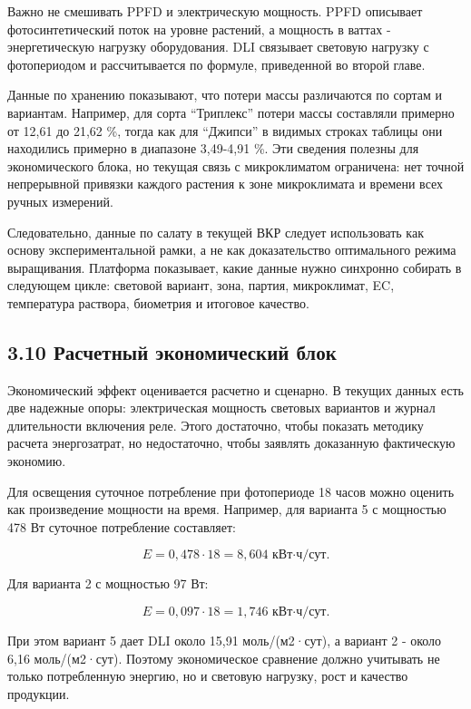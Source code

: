 \documentclass[a4paper,14pt]{extarticle}
\begin{document}
Важно не смешивать PPFD и электрическую мощность. PPFD описывает
фотосинтетический поток на уровне растений, а мощность в ваттах -
энергетическую нагрузку оборудования. DLI связывает световую нагрузку с
фотопериодом и рассчитывается по формуле, приведенной во второй главе.

Данные по хранению показывают, что потери массы различаются по сортам и
вариантам. Например, для сорта ``Триплекс'' потери массы составляли
примерно от 12,61 до 21,62 \%, тогда как для ``Джипси'' в видимых
строках таблицы они находились примерно в диапазоне 3,49-4,91 \%. Эти
сведения полезны для экономического блока, но текущая связь с
микроклиматом ограничена: нет точной непрерывной привязки каждого
растения к зоне микроклимата и времени всех ручных измерений.

Следовательно, данные по салату в текущей ВКР следует использовать как
основу экспериментальной рамки, а не как доказательство оптимального
режима выращивания. Платформа показывает, какие данные нужно синхронно
собирать в следующем цикле: световой вариант, зона, партия, микроклимат,
EC, температура раствора, биометрия и итоговое качество.

\subsection{3.10 Расчетный экономический
блок}\label{ux440ux430ux441ux447ux435ux442ux43dux44bux439-ux44dux43aux43eux43dux43eux43cux438ux447ux435ux441ux43aux438ux439-ux431ux43bux43eux43a}

Экономический эффект оценивается расчетно и сценарно. В текущих данных
есть две надежные опоры: электрическая мощность световых вариантов и
журнал длительности включения реле. Этого достаточно, чтобы показать
методику расчета энергозатрат, но недостаточно, чтобы заявлять
доказанную фактическую экономию.

Для освещения суточное потребление при фотопериоде 18 часов можно
оценить как произведение мощности на время. Например, для варианта 5 с
мощностью 478 Вт суточное потребление составляет:

\[
E = 0{,}478 \cdot 18 = 8{,}604 \text{ кВт·ч/сут}.
\]

Для варианта 2 с мощностью 97 Вт:

\[
E = 0{,}097 \cdot 18 = 1{,}746 \text{ кВт·ч/сут}.
\]

При этом вариант 5 дает DLI около 15,91 моль/(м2·сут), а вариант 2 -
около 6,16 моль/(м2·сут). Поэтому экономическое сравнение должно
учитывать не только потребленную энергию, но и световую нагрузку, рост и
качество продукции.
\end{document}
